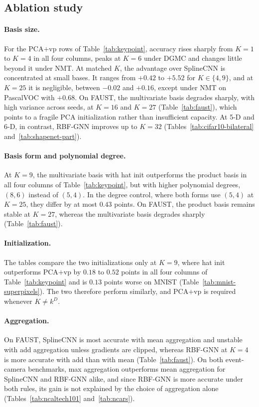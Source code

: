 \documentclass{article} %
\begin{document}
\subsection{Ablation study}
\label{sec:ablation}

\paragraph{Basis size.} For the PCA$+$vp rows of Table~\ref{tab:keypoint},
accuracy rises sharply from $K{=}1$ to $K{=}4$ in all four columns, peaks at
$K{=}6$ under DGMC and changes little beyond it under NMT. At matched $K$,
the advantage over SplineCNN is concentrated at small bases. It ranges from
$+0.42$ to $+5.52$ for $K \in \{4,9\}$, and at $K{=}25$ it is negligible,
between $-0.02$ and $+0.16$, except under NMT on PascalVOC with $+0.68$.
On
FAUST, the multivariate basis degrades sharply, with high variance across
seeds, at $K{=}16$ and $K{=}27$ (Table~\ref{tab:faust}), which points to a
fragile PCA initialization rather than insufficient capacity. At 5-D and 6-D,
in contrast, RBF-GNN improves up to $K{=}32$ (Tables~\ref{tab:cifar10-bilateral} and~\ref{tab:shapenet-part}).

\paragraph{Basis form and polynomial degree.} At $K{=}9$, the multivariate basis
with hat init outperforms the product basis in all four columns of
Table~\ref{tab:keypoint}, but with higher polynomial degrees, $(8,6)$ instead
of $(5,4)$. In the degree control, where both forms use $(5,4)$ at $K{=}25$,
they differ by at most $0.43$ points. On FAUST, the product basis remains
stable at $K{=}27$, whereas the multivariate basis degrades sharply
(Table~\ref{tab:faust}).

\paragraph{Initialization.} The tables compare the two initializations only at
$K{=}9$, where hat init outperforms PCA$+$vp by $0.18$ to $0.52$ points in all
four columns of Table~\ref{tab:keypoint} and is $0.13$ points worse on
MNIST (Table~\ref{tab:mnist-superpixels}). The two therefore perform similarly,
and PCA$+$vp is required whenever $K \neq k^D$.

\paragraph{Aggregation.} On FAUST, SplineCNN is most accurate with mean
aggregation and unstable with add aggregation unless gradients are
clipped, whereas RBF-GNN at $K{=}4$ is more accurate with add than
with mean (Table~\ref{tab:faust}). On both event-camera benchmarks, max aggregation
outperforms mean aggregation for SplineCNN and RBF-GNN alike, and since RBF-GNN
is more accurate under both rules, its gain is not explained by the choice of
aggregation alone (Tables~\ref{tab:ncaltech101}
and~\ref{tab:ncars}).
\end{document}

